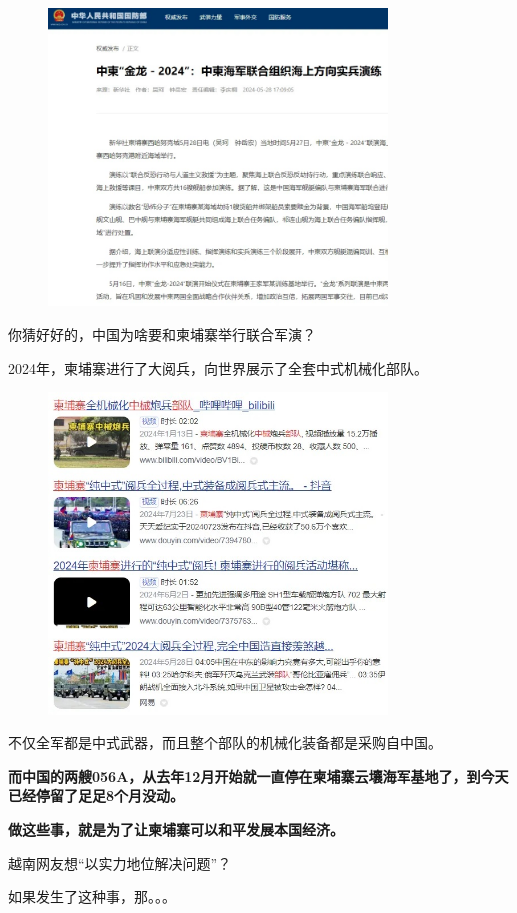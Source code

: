 \documentclass[UTF8, 11pt, oneside]{ctexart}
\newcommand{\zd}[1]{\textbf{\textcolor[RGB]{123,12,0}{#1}}} %
\begin{document}
\begin{figure}[H]
    \centering
    \includegraphics[width=9cm]{2024-08-17-004.jpg}
\end{figure}

你猜好好的，中国为啥要和柬埔寨举行联合军演？

2024年，柬埔寨进行了大阅兵，向世界展示了全套中式机械化部队。

\begin{figure}[H]
    \centering
    \includegraphics[width=9cm]{2024-08-17-005.jpg}
\end{figure}

不仅全军都是中式武器，而且整个部队的机械化装备都是采购自中国。

\zd{而中国的两艘056A，从去年12月开始就一直停在柬埔寨云壤海军基地了，到今天已经停留了足足8个月没动。}

\zd{做这些事，就是为了让柬埔寨可以和平发展本国经济。}

越南网友想“以实力地位解决问题”？

如果发生了这种事，那。。。
\end{document}
